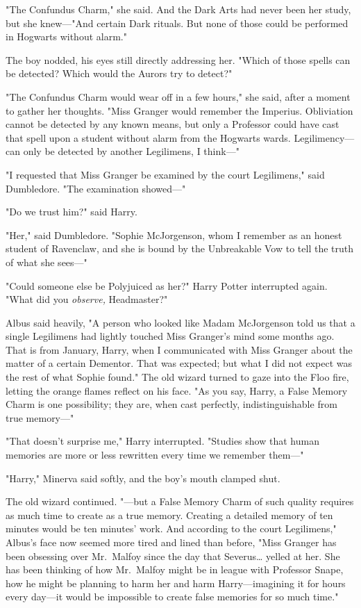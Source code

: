 "The Confundus Charm," she said. And the Dark Arts had never been her study, 
but she knew---"And certain Dark rituals. But none of those could be performed 
in Hogwarts without alarm."

The boy nodded, his eyes still directly addressing her. "Which of those spells 
can be detected? Which would the Aurors try to detect?"

"The Confundus Charm would wear off in a few hours," she said, after a moment 
to gather her thoughts. "Miss Granger would remember the Imperius. Obliviation 
cannot be detected by any known means, but only a Professor could have cast 
that spell upon a student without alarm from the Hogwarts wards. 
Legilimency---can only be detected by another Legilimens, I think---"

"I requested that Miss Granger be examined by the court Legilimens," said 
Dumbledore. "The examination showed---"

"Do we trust him?" said Harry.

"Her," said Dumbledore. "Sophie McJorgenson, whom I remember as an honest 
student of Ravenclaw, and she is bound by the Unbreakable Vow to tell the truth 
of what she sees---"

"Could someone else be Polyjuiced as her?" Harry Potter interrupted again. 
"What did you \emph{observe,} Headmaster?"

Albus said heavily, "A person who looked like Madam McJorgenson told us that a 
single Legilimens had lightly touched Miss Granger's mind some months ago. That 
is from January, Harry, when I communicated with Miss Granger about the matter 
of a certain Dementor. That was expected; but what I did not expect was the 
rest of what Sophie found." The old wizard turned to gaze into the Floo fire, 
letting the orange flames reflect on his face. "As you say, Harry, a False 
Memory Charm is one possibility; they are, when cast perfectly, 
indistinguishable from true memory---"

"That doesn't surprise me," Harry interrupted. "Studies show that human 
memories are more or less rewritten every time we remember them---"

"Harry," Minerva said softly, and the boy's mouth clamped shut.

The old wizard continued. "---but a False Memory Charm of such quality requires 
as much time to create as a true memory. Creating a detailed memory of ten 
minutes would be ten minutes' work. And according to the court Legilimens," 
Albus's face now seemed more tired and lined than before, "Miss Granger has 
been obsessing over Mr.~Malfoy since the day that Severus{\ldots} yelled at 
her. She has been thinking of how Mr.~Malfoy might be in league with Professor 
Snape, how he might be planning to harm her and harm Harry---imagining it for 
hours every day---it would be impossible to create false memories for so much 
time."

